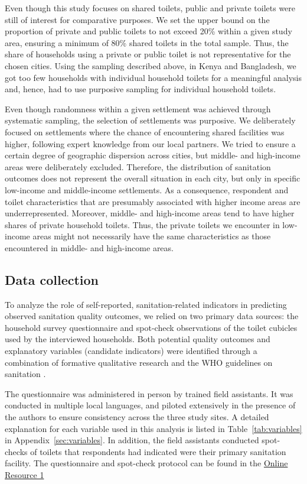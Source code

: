 \documentclass[natbib]{svjour3}                     %
\begin{document}
Even though this study focuses on shared toilets, public and private toilets were still of interest for comparative purposes. We set the upper bound on the proportion of private and public toilets to not exceed 20\% within a given study area, ensuring a minimum of 80\% shared toilets in the total sample. Thus, the share of households using a private or public toilet is not representative for the chosen cities. Using the sampling described above, in Kenya and Bangladesh, we got too few households with individual household toilets for a meaningful analysis and, hence, had to use purposive sampling for individual household toilets.

Even though randomness within a given settlement was achieved through systematic sampling, the selection of settlements was purposive. We deliberately focused on settlements where the chance of encountering shared facilities was higher, following expert knowledge from our local partners. We tried to ensure a certain degree of geographic dispersion across cities, but middle- and high-income areas were deliberately excluded. Therefore, the distribution of sanitation outcomes does not represent the overall situation in each city, but only in specific low-income and middle-income settlements. As a consequence, respondent and toilet characteristics that are presumably associated with higher income areas are underrepresented. Moreover, middle- and high-income areas tend to have higher shares of private household toilets. Thus, the private toilets we encounter in low-income areas might not necessarily have the same characteristics as those encountered in middle- and high-income areas.
%
\FloatBarrier
%
\subsection{Data collection}
\label{sec:measures}

To analyze the role of self-reported, sanitation-related indicators in predicting observed sanitation quality outcomes, we relied on two primary data sources: the household survey questionnaire and spot-check observations of the toilet cubicles used by the interviewed households. Both potential quality outcomes and explanatory variables (candidate indicators) were identified through a combination of formative qualitative research and the WHO guidelines on sanitation \citep{Schelbert2020, WHO2018}.

The questionnaire was administered in person by trained field assistants. It was conducted in multiple local languages, and piloted extensively in the presence of the authors to ensure consistency across the three study sites. A detailed explanation for each variable used in this analysis is listed in Table~\ref{tab:variables} in Appendix~\ref{sec:variables}. In addition, the field assistants conducted spot-checks of toilets that respondents had indicated were their primary sanitation facility. The questionnaire and spot-check protocol can be found in the \href{https://github.com/dariomeili/sanitation-indicators}{Online Resource 1} 
\end{document}
